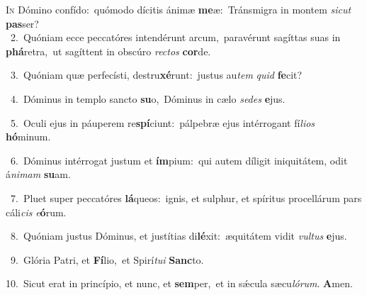 \lettrine{\initial\textcolor{\initialcolor}{I}}{n} Dómino confído:~\dagger quómodo dícitis ánimæ \textbf{me}\-æ:~\star Tránsmigra in montem \textit{sic}\-\textit{ut} \textbf{pas}\-ser?\\
{\numbfont\textcolor{\numbcolor}{~2.}}~Quóniam ecce peccatóres intendérunt arcum,~\dagger paravérunt sagíttas suas in \textbf{phá}\-retra,~\star ut sagíttent in obscúro \textit{rec}\-\textit{tos} \textbf{cor}\-de.\par
{\numbfont\textcolor{\numbcolor}{~3.}}~Quóniam quæ perfecísti, destru\-\textbf{xé}\-runt:~\star justus au\textit{tem} \textit{quid} \textbf{fe}\-cit?\par
{\numbfont\textcolor{\numbcolor}{~4.}}~Dóminus in templo sancto \textbf{su}\-o,~\star Dóminus in cælo \textit{se}\-\textit{des} \textbf{e}\-jus.\par
{\numbfont\textcolor{\numbcolor}{~5.}}~Oculi ejus in páuperem re\-\textbf{spí}\-ciunt:~\star pálpebræ ejus intérrogant fí\-\textit{li}\-\textit{os} \textbf{hó}\-minum.\par
{\numbfont\textcolor{\numbcolor}{~6.}}~Dóminus intérrogat justum et \textbf{ím}\-pium:~\star qui autem díligit iniquitátem, odit á\-\textit{ni}\-\textit{mam} \textbf{su}\-am.\par
{\numbfont\textcolor{\numbcolor}{~7.}}~Pluet super peccatóres \textbf{lá}\-queos:~\star ignis, et sulphur, et spíritus procellárum pars cáli\textit{cis} \textit{e}\-\textbf{ó}rum.\par
{\numbfont\textcolor{\numbcolor}{~8.}}~Quóniam justus Dóminus, et justítias di\-\textbf{lé}\-xit:~\star æquitátem vidit \textit{vul}\-\textit{tus} \textbf{e}\-jus.\par
{\numbfont\textcolor{\numbcolor}{~9.}}~Glória Patri, et \textbf{Fí}\-lio,~\star et Spirí\-\textit{tu}\-\textit{i} \textbf{Sanc}\-to.\par
{\numbfont\textcolor{\numbcolor}{10.}}~Sicut erat in princípio, et nunc, et \textbf{sem}\-per,~\star et in sǽcula sæcu\-\textit{ló}\-\textit{rum}. \textbf{A}\-men.\par
